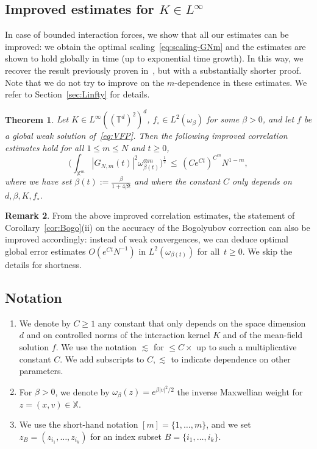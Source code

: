 \documentclass[a4paper,11pt,reqno,noindent]{amsart}
\theoremstyle{plain}
\newtheorem{theor}{Theorem}[section]
\theoremstyle{definition}
\newtheorem{rem}[theor]{Remark}
\numberwithin{equation}{section}
\newcommand{\Xd}{\mathbb X}
\newcommand{\T}{\mathbb T}
\begin{document}
\subsection{Improved estimates for $K\in L^\infty$}
In case of bounded interaction forces, we show that all our estimates can be improved: we obtain the optimal scaling~\eqref{eq:scaling-GNm} and the estimates are shown to hold globally in time (up to exponential time growth). In this way, we recover the result previously proven in~\cite{Hess_Childs_2023}, but with a substantially shorter proof.
Note that we do not try to improve on the $m$-dependence in these estimates.
We refer to Section~\ref{sec:Linfty} for details.

\begin{theor}\label{th:main-Linfty}
Let $K\in L^\infty((\T^d)^2)^d$, $f_\circ\in L^2(\omega_\beta)$ for some $\beta>0$, and let $f$ be a global weak solution of~\eqref{eq:VFP}.
Then the following improved correlation estimates hold for all $1\le m\le N$ and $t\ge0$,
\begin{equation}\label{eq:Linftybnd}
\Big(\int_{\Xd^m}|G_{N,m}(t)|^2\omega_{\beta(t)}^{\otimes m}\Big)^\frac12\,\le\, (Ce^{Ct})^{C^m}N^{1-m},
\end{equation}
where we have set $\beta(t):=\frac{\beta}{1+4\beta t}$ and where the constant $C$ only depends on $d,\beta,K,f_\circ$.
\end{theor}

\begin{rem}
From the above improved correlation estimates, the statement of Corollary~\ref{cor:Bogo}(ii) on the accuracy of the Bogolyubov correction can also be improved accordingly: instead of weak convergences, we can deduce optimal global error estimates $O(e^{Ct}N^{-1})$ in $L^2(\omega_{\beta(t)})$ for all~$t\ge0$. We skip the details for shortness.
\end{rem}

\subsection*{Notation}
\begin{enumerate}[---]
\item We denote by $C\ge1$ any constant that only depends on the space dimension $d$ and on controlled norms of the interaction kernel $K$ and of the mean-field solution $f$. We use the notation $\lesssim$ for $\le C\times$ up to such a multiplicative constant $C$. We add subscripts to $C,\lesssim$ to indicate dependence on other parameters.
\smallskip\item For $\beta>0$, we denote by $\omega_\beta(z)=e^{\beta|v|^2/2}$ the inverse Maxwellian weight for $z=(x,v)\in\Xd$.
\smallskip\item We use the short-hand notation $[m]=\{1,\ldots,m\}$, and we set $z_B=(z_{i_1},\ldots,z_{i_k})$ for an index subset $B=\{i_1,\ldots,i_k\}$.
\end{enumerate}
\end{document}
